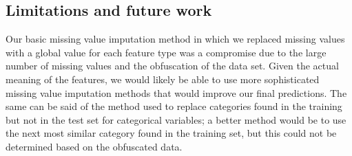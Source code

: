 \documentclass{article}\usepackage[]{graphicx}\usepackage[]{color}
\begin{document}
\subsection{Limitations and future work}                                                                                                                                                                                                                                                                                                                                                                                                                                                                                                                                                        Our basic missing value imputation method in which we replaced missing values with a global value for each feature type was a compromise due to the large number of missing values and the obfuscation of the data set. Given the actual meaning of the features, we would likely be able to use more sophisticated missing value imputation methods that would improve our final predictions. The same can be said of the method used to replace categories found in the training but not in the test set for categorical variables; a better method would be to use the next most similar category found in the training set, but this could not be determined based on the obfuscated data.                                                                                                                                                                                                                                                                                                                                                                                                                                                                                                                                                        
\end{document}
